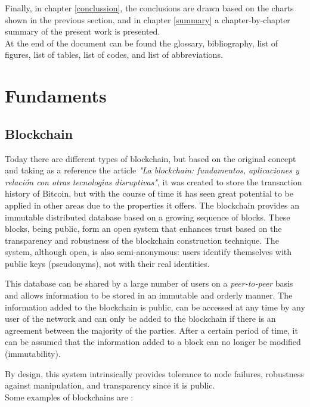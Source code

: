 \documentclass[MSE,Master,english]{twbook}%
\begin{document}
Finally, in chapter \ref{conclussion}, the conclusions are drawn based on the charts shown in the previous section, and in chapter \ref{summary} a chapter-by-chapter summary of the present work is presented. \\

At the end of the document can be found the glossary, bibliography, list of figures, list of tables, list of codes, and list of abbreviations.
\clearpage

\chapter{Fundaments\label{basics}}
\section{Blockchain}
Today there are different types of blockchain, but based on the original concept and taking as a reference the article \emph{"La blockchain: fundamentos, aplicaciones y relaci{\'o}n con otras tecnolog{\'\i}as disruptivas"}\cite{blockchain}, it was created to store the transaction history of Bitcoin, but with the course of time it has seen great potential to be applied in other areas due to the properties it offers. The blockchain provides an immutable distributed database based on a growing sequence of blocks. These blocks, being public, form an open system that enhances trust based on the transparency and robustness of the blockchain construction technique. The system, although open, is also semi-anonymous: users identify themselves with public keys (pseudonyms), not with their real identities.

This database can be shared by a large number of users on a \emph{peer-to-peer} basis and allows information to be stored in an immutable and orderly manner. The information added to the blockchain is public, can be accessed at any time by any user of the network and can only be added to the blockchain if there is an agreement between the majority of the parties. After a certain period of time, it can be assumed that the information added to a block can no longer be modified (immutability).

By design, this system intrinsically provides tolerance to node failures, robustness against manipulation, and transparency since it is public. \\

Some examples of blockchains are \cite{blockchainDummies}:
\end{document}
